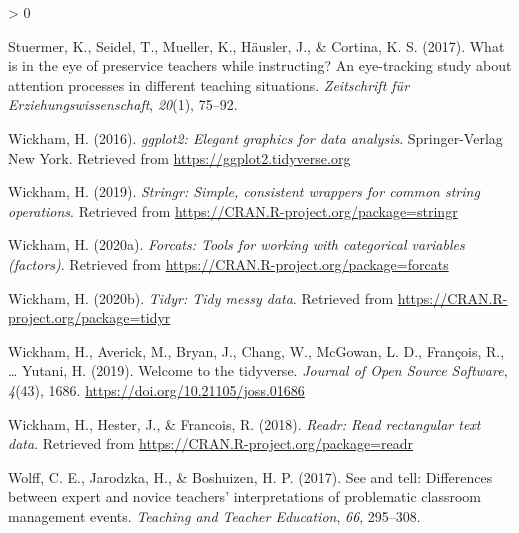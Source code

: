 \documentclass[
  english,
  man,floatsintext]{apa6}
\newlength{\cslhangindent}
\newenvironment{CSLReferences}[2] %
 {%
  \setlength{\parindent}{0pt}
  \ifodd #1 \everypar{\setlength{\hangindent}{\cslhangindent}}\ignorespaces\fi
  \ifnum #2 > 0
  \setlength{\parskip}{#2\baselineskip}
  \fi
 }%
 {}
\begin{document}
\begin{CSLReferences}{1}{0}
\leavevmode\hypertarget{ref-stuermer2017eye}{}%
Stuermer, K., Seidel, T., Mueller, K., Häusler, J., \& Cortina, K. S. (2017). What is in the eye of preservice teachers while instructing? An eye-tracking study about attention processes in different teaching situations. \emph{Zeitschrift f{ü}r Erziehungswissenschaft}, \emph{20}(1), 75--92.

\leavevmode\hypertarget{ref-R-ggplot2}{}%
Wickham, H. (2016). \emph{ggplot2: Elegant graphics for data analysis}. Springer-Verlag New York. Retrieved from \url{https://ggplot2.tidyverse.org}

\leavevmode\hypertarget{ref-R-stringr}{}%
Wickham, H. (2019). \emph{Stringr: Simple, consistent wrappers for common string operations}. Retrieved from \url{https://CRAN.R-project.org/package=stringr}

\leavevmode\hypertarget{ref-R-forcats}{}%
Wickham, H. (2020a). \emph{Forcats: Tools for working with categorical variables (factors)}. Retrieved from \url{https://CRAN.R-project.org/package=forcats}

\leavevmode\hypertarget{ref-R-tidyr}{}%
Wickham, H. (2020b). \emph{Tidyr: Tidy messy data}. Retrieved from \url{https://CRAN.R-project.org/package=tidyr}

\leavevmode\hypertarget{ref-R-tidyverse}{}%
Wickham, H., Averick, M., Bryan, J., Chang, W., McGowan, L. D., François, R., \ldots{} Yutani, H. (2019). Welcome to the {tidyverse}. \emph{Journal of Open Source Software}, \emph{4}(43), 1686. \url{https://doi.org/10.21105/joss.01686}

\leavevmode\hypertarget{ref-R-readr}{}%
Wickham, H., Hester, J., \& Francois, R. (2018). \emph{Readr: Read rectangular text data}. Retrieved from \url{https://CRAN.R-project.org/package=readr}

\leavevmode\hypertarget{ref-wolff2017see}{}%
Wolff, C. E., Jarodzka, H., \& Boshuizen, H. P. (2017). See and tell: Differences between expert and novice teachers' interpretations of problematic classroom management events. \emph{Teaching and Teacher Education}, \emph{66}, 295--308.

\end{CSLReferences}

\endgroup
\end{document}

